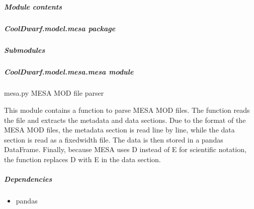 \documentclass[letterpaper,10pt,english]{sphinxmanual}
\begin{document}
\begin{fulllineitems}
\label{\detokenize{CoolDwarf.model.dsep:CoolDwarf.model.dsep.dsep.parse_dsep_MOD_file}}
\pysigstartsignatures
{}
\pysigstopsignatures
\end{fulllineitems}



\subparagraph{Module contents}
\label{\detokenize{CoolDwarf.model.dsep:module-CoolDwarf.model.dsep}}\label{\detokenize{CoolDwarf.model.dsep:module-contents}}
\sphinxstepscope


\subparagraph{CoolDwarf.model.mesa package}
\label{\detokenize{CoolDwarf.model.mesa:cooldwarf-model-mesa-package}}\label{\detokenize{CoolDwarf.model.mesa::doc}}

\subparagraph{Submodules}
\label{\detokenize{CoolDwarf.model.mesa:submodules}}

\subparagraph{CoolDwarf.model.mesa.mesa module}
\label{\detokenize{CoolDwarf.model.mesa:module-CoolDwarf.model.mesa.mesa}}\label{\detokenize{CoolDwarf.model.mesa:cooldwarf-model-mesa-mesa-module}}
\sphinxAtStartPar
mesa.py \textendash{} MESA MOD file parser

\sphinxAtStartPar
This module contains a function to parse MESA MOD files. The function reads the file and extracts the metadata and data sections.
Due to the format of the MESA MOD files, the metadata section is read line by line, while the data section is read as a fixed\sphinxhyphen{}width file.
The data is then stored in a pandas DataFrame. Finally, because MESA uses D instead of E for scientific notation, the function replaces D with E in the data section.


\subparagraph{Dependencies}
\label{\detokenize{CoolDwarf.model.mesa:dependencies}}\begin{itemize}
\item {} 
\sphinxAtStartPar
pandas

\end{itemize}
\end{document}
